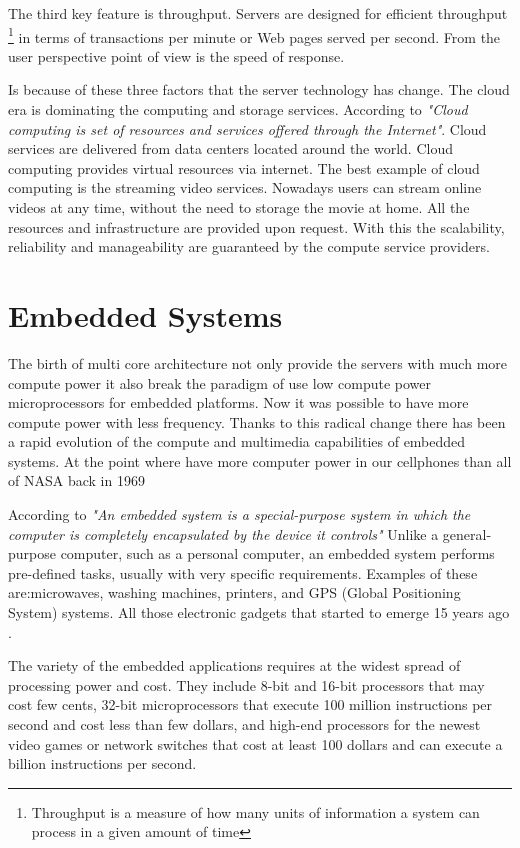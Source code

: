 The third key feature is throughput. Servers are designed for efficient
throughput \footnote{Throughput is a measure of how many units of information a
system can process in a given amount of time} in terms of transactions per
minute or Web pages served per second. From the user perspective point of view
is the speed of response.

Is because of these three factors that the server technology has change. The
cloud era is dominating the computing and storage services.  According to \cite
{Farhan} \textit{"Cloud computing is set of resources and services offered
through the Internet"}. Cloud services are delivered from data centers located
around the world.  Cloud computing provides virtual resources via internet. The
best example of cloud computing is the streaming video services. Nowadays users
can stream online videos  at any time, without the need to storage the movie at
home. All the resources and infrastructure are provided upon request. With this
the scalability, reliability and manageability are guaranteed by the compute
service providers. 

\section{Embedded Systems}
\noindent

The birth of multi core architecture not only provide the servers with much
more compute power it also break the paradigm of use low compute power
microprocessors for embedded platforms. Now it was possible to have more
compute power with less frequency. Thanks to this radical change there has been
a rapid evolution of the compute and multimedia capabilities of embedded
systems. At the point where have more computer power in our cellphones than all
of NASA back in 1969 \cite{Michio}

According to \cite{Hallinan} \textit{"An embedded system is a special-purpose
system in which the computer is completely encapsulated by the device it
controls"} Unlike a general-purpose computer, such as a personal computer, an
embedded system performs pre-defined tasks, usually with very specific
requirements. Examples of these are:microwaves, washing machines, printers, and
GPS (Global Positioning System) systems. All those electronic gadgets that
started to emerge 15 years ago \cite{Nur}.

The variety of the embedded applications requires at the widest spread
of processing power and cost. They include 8-bit and 16-bit processors that may
cost few cents, 32-bit microprocessors that execute 100 million instructions
per second and cost less than few dollars, and high-end processors for the
newest video games or network switches that cost at least 100 dollars and can
execute a billion instructions per second.\cite{Hennessy}

